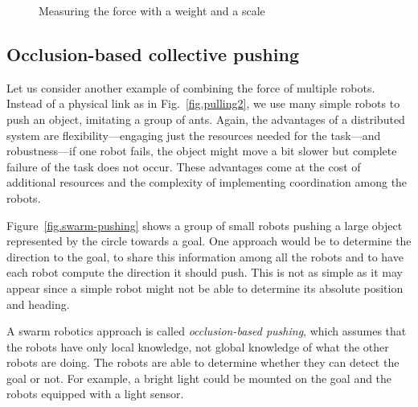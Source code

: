 \begin{figure}
\begin{center}
\caption{Measuring the force with a weight and a scale}\label{fig.scale}
\end{center}
\end{figure}

\subsection{Occlusion-based collective pushing}

Let us consider another example of combining the force of multiple robots. Instead of a physical link as in Fig.~\ref{fig.pulling2}, we use many simple robots to push an object, imitating a group of ants. Again, the advantages of a distributed system are flexibility---engaging just the resources needed for the task---and robustness---if one robot fails, the object might move a bit slower but complete failure of the task does not occur. These advantages come at the cost of additional resources and the complexity of implementing coordination among the robots.

Figure~\ref{fig.swarm-pushing} shows a group of small robots pushing a large object represented by the circle towards a goal. One approach would be to determine the direction to the goal, to share this information among all the robots and to have each robot compute the direction it should push. This is not as simple as it may appear since a simple robot might not be able to determine its absolute position and heading.

A swarm robotics approach is called \emph{occlusion-based pushing}, which assumes that the robots have only local knowledge, not global knowledge of what the other robots are doing. The robots are able to determine whether they can detect the goal or not. For example, a bright light could be mounted on the goal and the robots equipped with a light sensor. 

